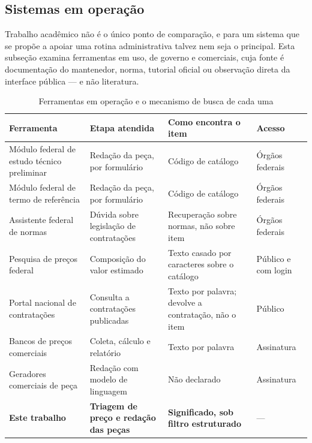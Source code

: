 \subsection{Sistemas em operação}
\label{subsec:sistemas-em-operacao}

Trabalho acadêmico não é o único ponto de comparação, e para um sistema que se
propõe a apoiar uma rotina administrativa talvez nem seja o principal. Esta
subseção examina ferramentas em uso, de governo e comerciais, cuja fonte é
documentação do mantenedor, norma, tutorial oficial ou observação direta da
interface pública --- e não literatura.

\begin{table}[H]
  \centering
  \caption{Ferramentas em operação e o mecanismo de busca de cada uma}
  \label{tab:sistemas-em-operacao}
  \begin{ufopaespacosimples}
  \footnotesize
  \begin{tabularx}{\textwidth}{@{}XXXl@{}}
    \toprule
    \textbf{Ferramenta} & \textbf{Etapa atendida} & \textbf{Como encontra o
      item} & \textbf{Acesso} \\
    \midrule
    Módulo federal de estudo técnico preliminar & Redação da peça, por
      formulário & Código de catálogo & Órgãos federais \\
    Módulo federal de termo de referência & Redação da peça, por formulário &
      Código de catálogo & Órgãos federais \\
    Assistente federal de normas & Dúvida sobre legislação de contratações &
      Recuperação sobre normas, não sobre item & Órgãos federais \\
    Pesquisa de preços federal & Composição do valor estimado & Texto casado por
      caracteres sobre o catálogo & Público e com login \\
    Portal nacional de contratações & Consulta a contratações publicadas & Texto
      por palavra; devolve a contratação, não o item & Público \\
    Bancos de preços comerciais & Coleta, cálculo e relatório & Texto por
      palavra & Assinatura \\
    Geradores comerciais de peça & Redação com modelo de linguagem & Não
      declarado & Assinatura \\
    \midrule
    \textbf{Este trabalho} & \textbf{Triagem de preço e redação das peças} &
      \textbf{Significado, sob filtro estruturado} & --- \\
    \bottomrule
  \end{tabularx}
  \end{ufopaespacosimples}
\end{table}

